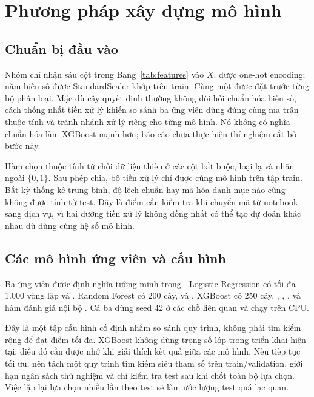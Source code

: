\chapter{Phương pháp xây dựng mô hình}
\section{Chuẩn bị đầu vào}
Nhóm chỉ nhận sáu cột trong Bảng~\ref{tab:features} vào $X$.  được one-hot encoding; năm biến số được StandardScaler khớp trên train. Cùng một  được đặt trước từng bộ phân loại. Mặc dù cây quyết định thường không đòi hỏi chuẩn hóa biến số, cách thống nhất tiền xử lý khiến so sánh ba ứng viên dùng đúng cùng ma trận thuộc tính và tránh nhánh xử lý riêng cho từng mô hình. Nó không có nghĩa chuẩn hóa làm XGBoost mạnh hơn; báo cáo chưa thực hiện thí nghiệm cắt bỏ bước này.

Hàm chọn thuộc tính từ chối dữ liệu thiếu ở các cột bắt buộc, loại  lạ và nhãn ngoài $\{0,1\}$. Sau phép chia, bộ tiền xử lý chỉ được  cùng mô hình trên tập train. Bất kỳ thống kê trung bình, độ lệch chuẩn hay mã hóa danh mục nào cũng không được tính từ test. Đây là điểm cần kiểm tra khi chuyển mã từ notebook sang dịch vụ, vì hai đường tiền xử lý không đồng nhất có thể tạo dự đoán khác nhau dù dùng cùng hệ số mô hình.

\section{Các mô hình ứng viên và cấu hình}
Ba ứng viên được định nghĩa tường minh trong . Logistic Regression có tối đa 1.000 vòng lặp và . Random Forest có 200 cây,  và . XGBoost có 250 cây, , , ,  và hàm đánh giá nội bộ . Cả ba dùng seed 42 ở các chỗ liên quan và chạy trên CPU.

Đây là một tập cấu hình cố định nhằm so sánh quy trình, không phải tìm kiếm rộng để đạt điểm tối đa. XGBoost không dùng trọng số lớp trong triển khai hiện tại; điều đó cần được nhớ khi giải thích kết quả giữa các mô hình. Nếu tiếp tục tối ưu, nên tách một quy trình tìm kiếm siêu tham số trên train/validation, giới hạn ngân sách thử nghiệm và chỉ kiểm tra test sau khi chốt toàn bộ lựa chọn. Việc lặp lại lựa chọn nhiều lần theo test sẽ làm ước lượng test quá lạc quan.

